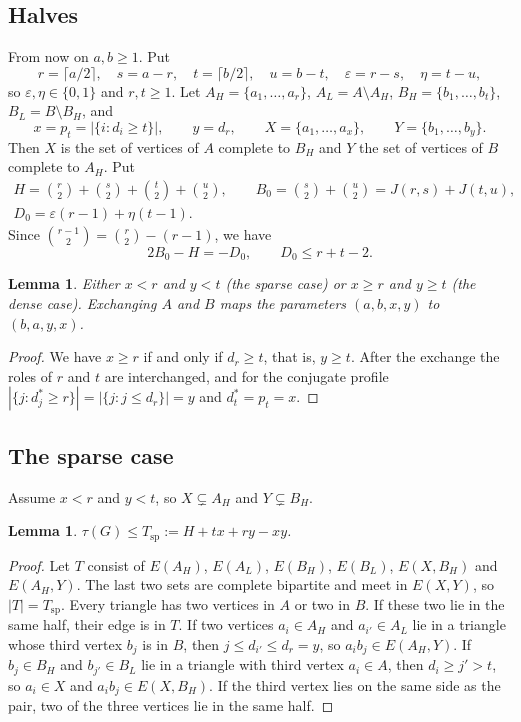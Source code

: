 \documentclass{amsart}
\newtheorem{lemma}[theorem]{Lemma}
\theoremstyle{definition}
\theoremstyle{remark}
\numberwithin{equation}{section}
\numberwithin{table}{section}
\begin{document}
\subsection{Halves}\label{ssec:halves}
From now on $a,b\ge1$. Put
\[
r=\lceil a/2\rceil,\quad s=a-r,\quad t=\lceil b/2\rceil,\quad u=b-t,\quad \varepsilon=r-s,\quad \eta=t-u,
\]
so $\varepsilon,\eta\in\{0,1\}$ and $r,t\ge1$. Let $A_H=\{a_1,\dots,a_r\}$, $A_L=A\setminus A_H$, $B_H=\{b_1,\dots,b_t\}$, $B_L=B\setminus B_H$, and
\[
x=p_t=|\{i:d_i\ge t\}|,\qquad y=d_r,\qquad X=\{a_1,\dots,a_x\},\qquad Y=\{b_1,\dots,b_y\}.
\]
Then $X$ is the set of vertices of $A$ complete to $B_H$ and $Y$ the set of vertices of $B$ complete to $A_H$. Put
\begin{gather*}
H=\binom r2+\binom s2+\binom t2+\binom u2,\qquad B_0=\binom s2+\binom u2=J(r,s)+J(t,u),\\
D_0=\varepsilon(r-1)+\eta(t-1).
\end{gather*}
Since $\binom{r-1}2=\binom r2-(r-1)$, we have
\begin{equation}\label{eq:B0H}
2B_0-H=-D_0,\qquad D_0\le r+t-2.
\end{equation}

\begin{lemma}\label{lem:dichotomy}
Either $x<r$ and $y<t$ (the \emph{sparse case}) or $x\ge r$ and $y\ge t$ (the \emph{dense case}). Exchanging $A$ and $B$ maps the parameters $(a,b,x,y)$ to $(b,a,y,x)$.
\end{lemma}

\begin{proof}
We have $x\ge r$ if and only if $d_r\ge t$, that is, $y\ge t$. After the exchange the roles of $r$ and $t$ are interchanged, and for the conjugate profile $|\{j:d^*_j\ge r\}|=|\{j:j\le d_r\}|=y$ and $d^*_t=p_t=x$.
\end{proof}

\subsection{The sparse case}\label{ssec:sparse}
Assume $x<r$ and $y<t$, so $X\subsetneq A_H$ and $Y\subsetneq B_H$.

\begin{lemma}\label{lem:sparsecover}
$\tau(G)\le T_{\mathrm{sp}}:=H+tx+ry-xy$.
\end{lemma}

\begin{proof}
Let $T$ consist of $E(A_H)$, $E(A_L)$, $E(B_H)$, $E(B_L)$, $E(X,B_H)$ and $E(A_H,Y)$. The last two sets are complete bipartite and meet in $E(X,Y)$, so $|T|=T_{\mathrm{sp}}$. Every triangle has two vertices in $A$ or two in $B$. If these two lie in the same half, their edge is in $T$. If two vertices $a_i\in A_H$ and $a_{i'}\in A_L$ lie in a triangle whose third vertex $b_j$ is in $B$, then $j\le d_{i'}\le d_r=y$, so $a_ib_j\in E(A_H,Y)$. If $b_j\in B_H$ and $b_{j'}\in B_L$ lie in a triangle with third vertex $a_i\in A$, then $d_i\ge j'>t$, so $a_i\in X$ and $a_ib_j\in E(X,B_H)$. If the third vertex lies on the same side as the pair, two of the three vertices lie in the same half.
\end{proof}
\end{document}
